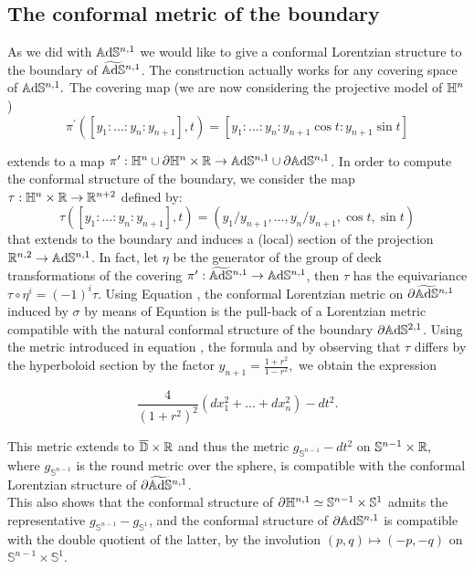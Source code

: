 \subsection{The conformal metric of the boundary} 
As we did with $\mathbb{A}\mathrm{d}\mathbb{S}^{n,1}$ we would like to give a conformal Lorentzian structure to the boundary of $\widetilde{\mathbb{A}\mathrm{d}\mathbb{S}}{}^{n,1}$. The construction actually works for any covering space of $\mathbb{A}\mathrm{d}\mathbb{S}^{n,1}.$ The covering map (we are now considering the projective model of $\mathbb{H}^n$)
\[
    \pi^{\prime} ([y_1:\dots:y_{n}:y_{n+1}],t)=[y_1:\dots:y_n:y_{n+1}\cos t:y_{n+1}\sin t]
\]

extends to a map $\pi^{\prime}:\mathbb{H}^n\cup \partial\mathbb{H}^n\times \mathbb{R}\to \mathbb{A}\mathrm{d}\mathbb{S}^{n,1}\cup \partial\mathbb{A}\mathrm{d}\mathbb{S}^{n,1}$. In order to compute the conformal structure of the boundary, we consider the map $\tau: \mathbb{H}^n\times \mathbb{R}\to\mathbb{R}^{n+2}$ defined by:
\[
    \tau([y_1:\dots:y_n:y_{n+1}],t)=(y_1/y_{n+1},\dots,y_n/y_{n+1},\cos t,\sin t)
\]  
 that extends to the boundary and induces a (local) section of the projection $\mathbb{R}^{n,2}\to \mathbb{A}\mathrm{d}\mathbb{S}^{n,1}$. In fact, let $\eta$ be the generator of the group of deck transformations of the covering $\pi^{\prime}:\widetilde{\mathbb{A}\mathrm{d}\mathbb{S}}{}^{n,1}   \to \mathbb{A}\mathrm{d}\mathbb{S}^{n,1}$, then $\tau$ has the equivariance $\tau\circ\eta^i=(-1)^i\tau.$   Using Equation , the conformal Lorentzian metric on $\partial\widetilde{\mathbb{A}\mathrm{d}\mathbb{S}}{}^{n,1}$ induced by $\sigma$ by means of Equation  is the pull-back of a Lorentzian metric compatible with the natural conformal structure of the boundary $\partial\mathbb{A}\mathrm{d}\mathbb{S}^{2,1}$. Using the metric introduced in equation , the formula  and by observing that $\tau$ differs by the hyperboloid section by the factor $y_{n+1}=\frac{1+r^2}{1-r^2},$ we obtain the expression 

 \begin{equation}
    \frac{4}{(1+r^2)^2}(dx_1^{2}+\dots+dx_n^2)-dt^2.
 \end{equation}

 This metric extends to $\overline{\mathbb{D}}\times\mathbb{R}$ and thus the metric $g_{\mathbb{S}^{n-1}}-dt^2$ on $\mathbb{S}^{n-1}\times\mathbb{R},$ where $g_{\mathbb{S}^{n-1}}$ is the round metric over the sphere, is compatible with the conformal Lorentzian structure of $\partial\widetilde{\mathbb{A}\mathrm{d}\mathbb{S}}{}^{n,1}$.\\ 
 This also shows that the conformal structure of $\partial \mathbb{H}^{n,1}\simeq\mathbb{S}^{n-1}\times\mathbb{S}^1$ admits the representative $g_{\mathbb{S}^{n-1}}-g_{\mathbb{S}^1}$, and the conformal structure of $\partial\mathbb{A}\mathrm{d}\mathbb{S}^{n,1}$ is compatible with the double quotient of the latter, by the involution $(p,q)\mapsto (-p,-q)$ on $\mathbb{S}^{n-1}\times\mathbb{S}^1$.\\
